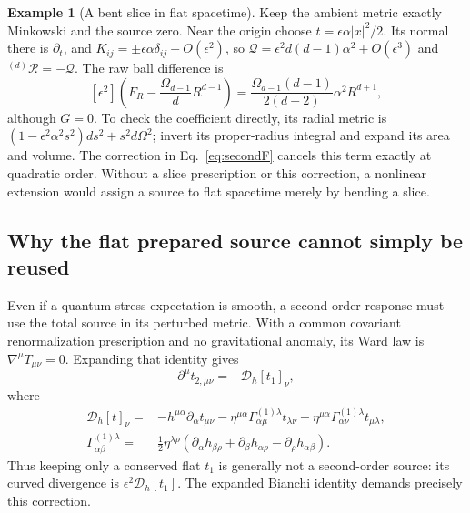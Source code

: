 \documentclass[12pt]{article}
\theoremstyle{definition}
\newtheorem{example}[theorem]{Example}
\theoremstyle{remark}
\begin{document}
\begin{example}[A bent slice in flat spacetime]
\label{ex:bent-slice}
Keep the ambient metric exactly Minkowski and the source zero. Near the
origin choose $t=\epsilon\alpha |x|^2/2$. Its normal there is $\partial_t$,
and $K_{ij}=\pm\epsilon\alpha\delta_{ij}+O(\epsilon^2)$, so
$\mathcal Q=\epsilon^2d(d-1)\alpha^2+O(\epsilon^3)$ and
$ {}^{(d)}\!\mathcal R=-\mathcal Q$. The raw ball difference is
\[
 [\epsilon^2]\left(F_R-\frac{\Omega_{d-1}}dR^{d-1}\right)
 =\frac{\Omega_{d-1}(d-1)}{2(d+2)}\alpha^2 R^{d+1},
\]
although $G=0$. To check the coefficient directly, its radial metric is
$(1-\epsilon^2\alpha^2s^2)ds^2+s^2d\Omega^2$; invert its proper-radius
integral and expand its area and volume. The correction in
Eq.~\eqref{eq:secondF} cancels this term exactly at quadratic order.
Without a slice prescription or this correction, a nonlinear extension
would assign a source to flat spacetime merely by bending a slice.
\end{example}

\subsection{Why the flat prepared source cannot simply be reused}

Even if a quantum stress expectation is smooth, a second-order response
must use the total source in its perturbed metric. With a common covariant
renormalization prescription and no gravitational anomaly, its Ward law
is $\nabla^\mu T_{\mu\nu}=0$. Expanding that identity gives
\begin{equation}
 \partial^\mu t_{2,\mu\nu}=-\mathcal D_h[t_1]_\nu,
 \label{eq:secondward}
\end{equation}
where
\begin{align*}
 \mathcal D_h[t]_\nu={}&-h^{\mu\alpha}\partial_\alpha t_{\mu\nu}
 -\eta^{\mu\alpha}\Gamma^{(1)\lambda}_{\alpha\mu}t_{\lambda\nu}
 -\eta^{\mu\alpha}\Gamma^{(1)\lambda}_{\alpha\nu}t_{\mu\lambda},\\
 \Gamma^{(1)\lambda}_{\alpha\beta}={}&\tfrac12\eta^{\lambda\rho}
 (\partial_\alpha h_{\beta\rho}+\partial_\beta h_{\alpha\rho}
                                  -\partial_\rho h_{\alpha\beta}).
\end{align*}
Thus keeping only a conserved flat $t_1$ is generally not a second-order
source: its curved divergence is $\epsilon^2\mathcal D_h[t_1]$.
The expanded Bianchi identity demands precisely this correction.
\end{document}
